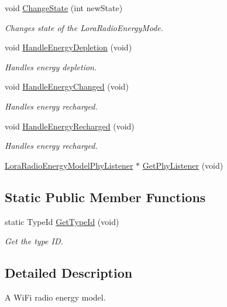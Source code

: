 \begin{DoxyCompactItemize}
void \hyperlink{classns3_1_1lorawan_1_1LoraRadioEnergyModel_a6be2e24f42f160bb2cf738baa852ead0}{Change\+State} (int new\+State)
\begin{DoxyCompactList}\small\item\em Changes state of the Lora\+Radio\+Energy\+Mode. \end{DoxyCompactList}\item 
void \hyperlink{classns3_1_1lorawan_1_1LoraRadioEnergyModel_a71bb7a383f4c6b97a34f0185fb059996}{Handle\+Energy\+Depletion} (void)
\begin{DoxyCompactList}\small\item\em Handles energy depletion. \end{DoxyCompactList}\item 
void \hyperlink{classns3_1_1lorawan_1_1LoraRadioEnergyModel_a273129f01f327c1201269703e5a45b08}{Handle\+Energy\+Changed} (void)
\begin{DoxyCompactList}\small\item\em Handles energy recharged. \end{DoxyCompactList}\item 
void \hyperlink{classns3_1_1lorawan_1_1LoraRadioEnergyModel_a6aaebbbe9d57a1ed344ab16e9f0c9bb5}{Handle\+Energy\+Recharged} (void)
\begin{DoxyCompactList}\small\item\em Handles energy recharged. \end{DoxyCompactList}\item 
\hyperlink{classns3_1_1lorawan_1_1LoraRadioEnergyModelPhyListener}{Lora\+Radio\+Energy\+Model\+Phy\+Listener} $\ast$ \hyperlink{classns3_1_1lorawan_1_1LoraRadioEnergyModel_afed097f1370397dfe2f2e887566806de}{Get\+Phy\+Listener} (void)
\end{DoxyCompactItemize}
\subsection*{Static Public Member Functions}
\begin{DoxyCompactItemize}
\item 
static Type\+Id \hyperlink{classns3_1_1lorawan_1_1LoraRadioEnergyModel_a87828851482c17605655408a87c01873}{Get\+Type\+Id} (void)
\begin{DoxyCompactList}\small\item\em Get the type ID. \end{DoxyCompactList}\end{DoxyCompactItemize}


\subsection{Detailed Description}
A Wi\+Fi radio energy model. 

